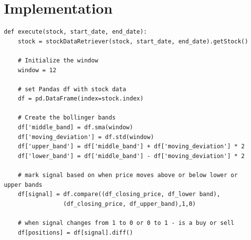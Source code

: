 \documentclass[letterpaper,11pt]{article}
\begin{document}
\section*{Implementation}
\begin{verbatim}
def execute(stock, start_date, end_date):
    stock = stockDataRetriever(stock, start_date, end_date).getStock()

    # Initialize the window
    window = 12

    # set Pandas df with stock data
    df = pd.DataFrame(index=stock.index)

    # Create the bollinger bands
    df['middle_band] = df.sma(window)
    df['moving_deviation'] = df.std(window)
    df['upper_band'] = df['middle_band'] + df['moving_deviation'] * 2
    df['lower_band'] = df['middle_band'] - df['moving_deviation'] * 2

    # mark signal based on when price moves above or below lower or upper bands
    df[signal] = df.compare((df_closing_price, df_lower band), 
    		     (df_closing_price, df_upper_band),1,0)

    # when signal changes from 1 to 0 or 0 to 1 - is a buy or sell
    df[positions] = df[signal].diff()

\end{verbatim}



\end{document}
